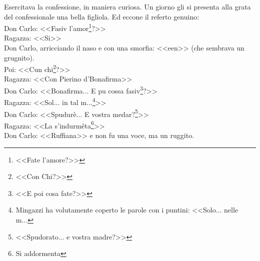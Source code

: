 Esercitava la confessione, in maniera curiosa. Un giorno gli si presenta alla grata del confessionale una bella figliola. Ed eccone il referto genuino:\\
\indent {}Don Carlo: <<Fasiv l'amor\footnote{<<Fate l'amore?>>}?>>\\
\indent Ragazza: <<Si>>\\
\indent {}Don Carlo, arricciando il naso e con una smorfia: <<een>> (che sembrava un grugnito).\\
\indent Poi: <<Cun chi\footnote{<<Con Chi?>>}?>>\\
\indent Ragazza: <<Con Pierino d'Bonafirma>>\\
\indent {}Don Carlo: <<Bonafirma... E pu cossa fasiv\footnote{<<E poi cosa fate?>>}?>>\\
\indent Ragazza: <<Sol... in tal m...\footnote{Mingazzi ha volutamente coperto le parole con i puntini: <<Solo... nelle m...}>>\\
\indent {}Don Carlo: <<Spudurè... E vostra medar?\footnote{<<Spudorato... e vostra madre?>>}>>\\
\indent Ragazza: <<La s'indurmêta\footnote{Si addormenta}>>\\
\indent {}Don Carlo: <<Ruffiana>> e non fu una voce, ma un ruggito.\\






































%